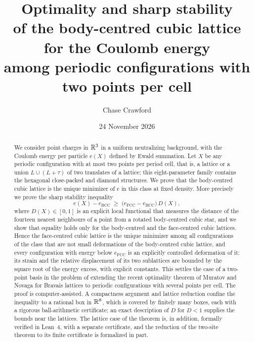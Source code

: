 \documentclass[11pt]{amsart}
\theoremstyle{definition}
\theoremstyle{remark}
\numberwithin{equation}{section}
\numberwithin{table}{section}
\begin{document}
\title[BCC optimality for two-point periodic Coulomb configurations]{Optimality and sharp stability\\ of the body-centred cubic lattice for the Coulomb energy\\
among periodic configurations with two points per cell}
\author[]{Chase Crawford}
\date{24 November 2026}

\begin{abstract}
We consider point charges in $\mathbb R^3$ in a uniform neutralizing background, with the Coulomb energy per particle $e(X)$ defined by Ewald
summation. Let $X$ be any periodic configuration with at most two points per period cell, that is, a lattice or a union $L\cup(L+\tau)$
of two translates of a lattice; this eight-parameter family contains the hexagonal close-packed and diamond structures. We prove that
the body-centred cubic lattice is the unique minimizer of $e$ in this class at fixed density. More precisely we prove the sharp
stability inequality
\[
   e(X)-e_{\mathrm{BCC}}\;\ge\;\bigl(e_{\mathrm{FCC}}-e_{\mathrm{BCC}}\bigr)\,D(X),
\]
where $D(X)\in[0,1]$ is an explicit local functional that measures the distance of the fourteen nearest neighbours of a point from a
rotated body-centred cubic star, and we show that equality holds only for the body-centred and the face-centred cubic lattices. Hence
the face-centred cubic lattice is the unique minimizer among all configurations of the class that are not small deformations of the
body-centred cubic lattice, and every configuration with energy below $e_{\mathrm{FCC}}$ is an explicitly controlled deformation of it:
its strain and the relative displacement of its two sublattices are bounded by the square root of the energy excess, with explicit
constants. This settles the case of a two-point basis in the problem of extending the recent optimality theorem of Muratov and Novaga
for Bravais lattices to periodic configurations with several points per cell. The proof is computer-assisted. A compactness argument
and lattice reduction confine the inequality to a rational box in $\mathbb R^8$, which is covered by finitely many boxes, each with a
rigorous ball-arithmetic certificate; an exact description of $D$ for $D<1$ supplies the bounds near the lattices. The lattice case
of the theorem is, in addition, formally verified in Lean~4, with a separate certificate, and the reduction of the two-site theorem
to its finite certificate is formalized in part.
\end{abstract}
\end{document}
